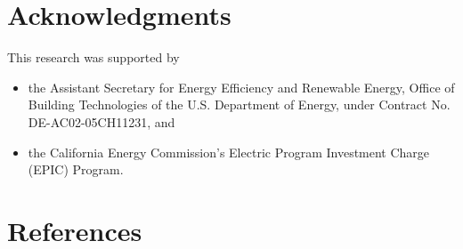 \documentclass[letterpaper,10pt, openany,english]{sphinxmanual}
\begin{document}
\chapter{Acknowledgments}
\label{\detokenize{acknowledgments:acknowledgments}}\label{\detokenize{acknowledgments::doc}}
This research was supported by
\begin{itemize}
\item {} 
the Assistant Secretary for
Energy Efficiency and Renewable Energy, Office of Building Technologies
of the U.S. Department of Energy, under Contract No. DE-AC02-05CH11231, and

\item {} 
the California Energy Commission’s Electric Program Investment Charge (EPIC) Program.

\end{itemize}


\chapter{References}
\label{\detokenize{bibliography:references}}\label{\detokenize{bibliography:id1}}\label{\detokenize{bibliography::doc}}
\end{document}
